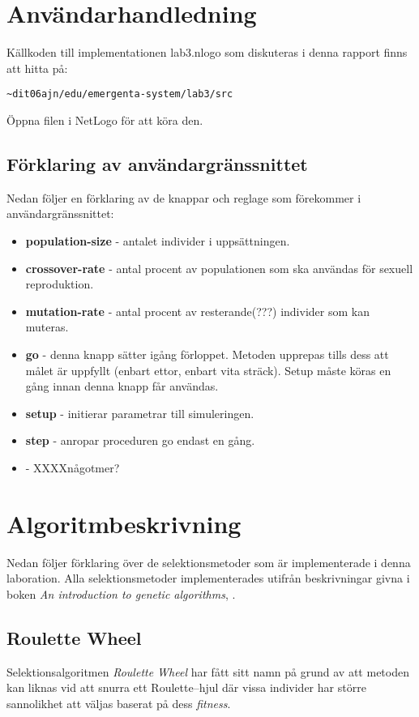 \documentclass[titlepage, a4paper, 12pt]{article}
\begin{document}
\section{Användarhandledning}
Källkoden till implementationen lab3.nlogo som diskuteras i denna
rapport finns att hitta på:

\verb!~dit06ajn/edu/emergenta-system/lab3/src!

Öppna filen i NetLogo för att köra den.

\subsection{Förklaring av användargränssnittet}
Nedan följer en förklaring av de knappar och reglage som förekommer i
användargränssnittet:

\begin{itemize}
\item \textbf{population-size} - antalet individer i uppsättningen.
\item \textbf{crossover-rate} - antal procent av populationen som ska användas för sexuell reproduktion.
\item \textbf{mutation-rate} - antal procent av resterande(???) individer som kan muteras.
\item \textbf{go} - denna knapp sätter igång förloppet. Metoden upprepas tills dess att målet är uppfyllt (enbart ettor, enbart vita sträck). Setup måste köras en gång innan denna knapp får användas.
\item \textbf{setup} - initierar parametrar till simuleringen.
\item \textbf{step} - anropar proceduren go endast en gång.
\item \textbf{} - XXXXnågotmer?
\end{itemize}

\section{Algoritmbeskrivning}
Nedan följer förklaring över de selektionsmetoder som är
implementerade i denna laboration. Alla selektionsmetoder
implementerades utifrån beskrivningar givna i boken \textit{An
  introduction to genetic algorithms}, \cite{gen-intro}.

\subsection{Roulette Wheel}\label{sec:roulette-wheel}
Selektionsalgoritmen \textit{Roulette Wheel} har fått sitt namn på
grund av att metoden kan liknas vid att snurra ett Roulette–hjul där
vissa individer har större sannolikhet att väljas baserat på dess
\textit{fitness}.
\end{document}
